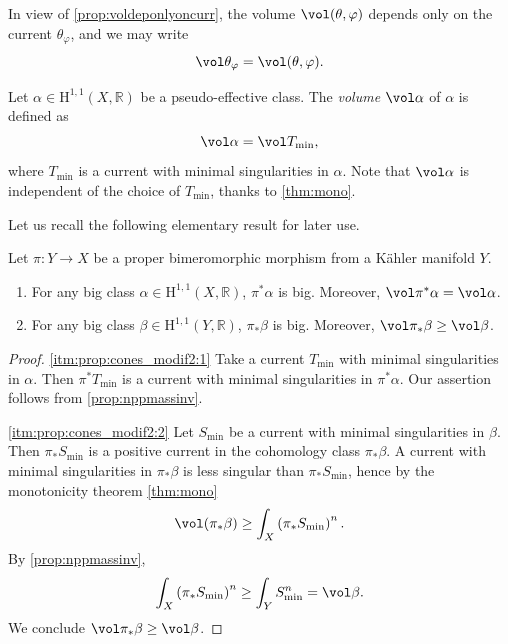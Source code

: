 In view of \cref{prop:voldeponlyoncurr}, the volume $\vol(\theta,\varphi)$ depends only on the current $\theta_{\varphi}$, and we may write
\begin{equation}\label{eq:volcurrdef}
    \vol \theta_{\varphi}=\vol(\theta,\varphi).
\end{equation}
\index{$\vol \theta_{\varphi}$}

\begin{definition}\label{def:volcohclass}
    Let $\alpha\in \mathrm{H}^{1,1}(X,\mathbb{R})$ be a pseudo-effective class. The \emph{volume} $\vol \alpha$ of $\alpha$ is defined as
    \[
    \vol \alpha=\vol T_{\min},
    \]
    where $T_{\min}$ is a current with minimal singularities in $\alpha$. Note that $\vol \alpha$ is independent of the choice of $T_{\min}$, thanks to \cref{thm:mono}.
\end{definition}

Let us recall the following elementary result for later use.
\begin{proposition}\label{prop:cones_modif2}
    Let $\pi\colon Y\rightarrow X$ be a proper bimeromorphic morphism from a Kähler manifold $Y$.
    \begin{enumerate}
        \item\label{itm:prop:cones_modif2:1} For any big class $\alpha\in \mathrm{H}^{1,1}(X,\mathbb{R})$, $\pi^*\alpha$ is big. Moreover, $\vol \pi^*\alpha=\vol \alpha$.
        \item\label{itm:prop:cones_modif2:2} For any big class $\beta\in \mathrm{H}^{1,1}(Y,\mathbb{R})$, $\pi_*\beta$ is big. Moreover, $\vol \pi_*\beta\geq \vol \beta$.
    \end{enumerate}
\end{proposition}
\begin{proof}
    \ref{itm:prop:cones_modif2:1} Take a current $T_{\min}$ with minimal singularities in $\alpha$. Then $\pi^*T_{\min}$ is a current with minimal singularities in $\pi^*\alpha$. Our assertion follows from \cref{prop:nppmassinv}.

    \ref{itm:prop:cones_modif2:2} Let $S_{\min}$ be a current with minimal singularities in $\beta$. Then $\pi_*S_{\min}$ is a positive current in the cohomology class $\pi_*\beta$. A current with minimal singularities in $\pi_*\beta$ is less singular than $\pi_*S_{\min}$, hence by the monotonicity theorem \cref{thm:mono}
    \[
        \vol(\pi_*\beta)\geq \int_X\left(\pi_*S_{\min}\right)^n.
    \]
    By \cref{prop:nppmassinv},
    \[
        \int_X \left(\pi_*S_{\min}\right)^n\geq \int_Y S_{\min}^n=\vol\beta.
    \]
    We conclude $\vol \pi_*\beta\geq \vol \beta$.
\end{proof}


